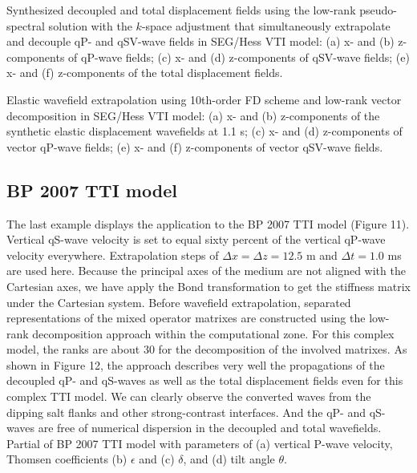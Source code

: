 {
  Synthesized decoupled and total displacement fields using the low-rank pseudo-spectral
  solution with the $k$-space adjustment that simultaneously extrapolate and decouple qP- and qSV-wave fields in SEG/Hess VTI model:
  (a) x- and (b) z-components of qP-wave fields;
  (c) x- and (d) z-components of qSV-wave fields;
  (e) x- and (f) z-components of the total displacement fields.
}

  {
 Elastic wavefield extrapolation using 10th-order FD scheme and low-rank vector decomposition
 in SEG/Hess VTI model:
 (a) x- and (b) z-components of the synthetic elastic displacement wavefields at 1.1 s;
 (c) x- and (d) z-components of vector qP-wave fields;
 (e) x- and (f) z-components of vector qSV-wave fields.
  } 

\subsection{BP 2007 TTI model}
{
The last example displays the application to the BP 2007 TTI  model (Figure 11).
Vertical qS-wave velocity is set to equal sixty percent of the vertical qP-wave velocity everywhere.
Extrapolation steps of $\Delta{x}=\Delta{z}=12.5 $ m and $\Delta{t}=1.0$ ms are used here.
Because the principal axes of the medium are not aligned with the Cartesian axes, we have apply the Bond transformation
to get the stiffness matrix under the Cartesian system.
Before wavefield extrapolation, separated representations of the mixed operator matrixes are constructed using the
low-rank decomposition approach within the computational zone.
For this complex model, the ranks are about $30$ for the decomposition of the involved matrixes.
As shown in Figure 12, the approach describes very well the propagations of the decoupled qP- and qS-waves as well as the total
 displacement fields even for this complex TTI model. 
We can clearly observe the converted waves from the dipping salt flanks and other strong-contrast interfaces.
And the qP- and qS-waves are free of numerical dispersion in the decoupled and total wavefields.
}
{
Partial of BP 2007 TTI model with parameters of (a) vertical P-wave velocity, Thomsen coefficients
(b) $\epsilon$ and (c) $\delta$, and (d) tilt angle $\theta$.
}

